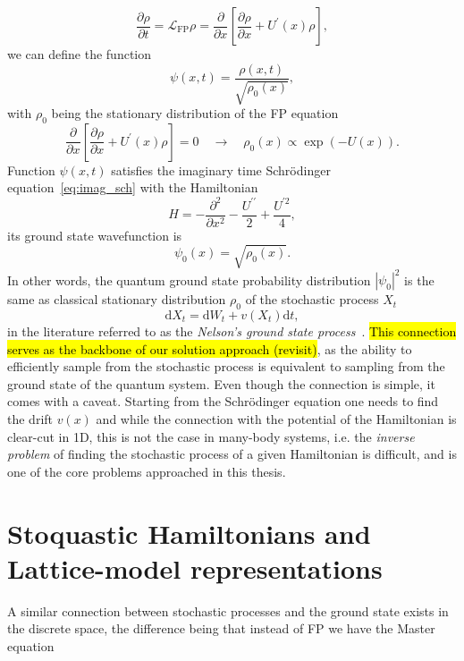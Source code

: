 \begin{equation}
	\frac{\partial \rho}{\partial t}=\mathcal{L}_{\mathrm{FP}} \rho=\frac{\partial}{\partial x}\left[\frac{\partial \rho}{\partial x}+U^{\prime}(x) \rho\right],
\end{equation}
we can define the function 
\begin{equation}
	\psi(x, t)=\frac{\rho(x, t)}{\sqrt{\rho_{0}(x)}},
\end{equation}
with $\rho_{0}$ being the stationary distribution of the FP equation
\begin{equation}
	\frac{\partial}{\partial x}\left[\frac{\partial \rho}{\partial x}+U^{\prime}(x) \rho\right] = 0 \quad \rightarrow \quad \rho_{0}(x) \propto \exp (-U(x)).
\end{equation}
Function $\psi(x, t)$ satisfies the imaginary time Schr\" odinger equation~\eqref{eq:imag_sch} with the Hamiltonian
\begin{equation}
	H=-\frac{\partial^{2}}{\partial x^{2}}-\frac{U^{\prime \prime}}{2}+\frac{U^{\prime 2}}{4}, 
\end{equation}
its ground state wavefunction is 
\begin{equation}
	\psi_{0}(x)=\sqrt{\rho_{0}(x)}.
\end{equation}
In other words, the quantum ground state probability distribution $|\psi_{0}|^2$ is the same as classical stationary distribution $\rho_{0}$ of the stochastic process $X_{t}$
\begin{equation}
	\mathrm{d} X_{t}=\mathrm{d} W_{t}+v\left(X_{t}\right) \mathrm{d} t,
\end{equation}
in the literature referred to as the \emph{Nelson's ground state process}~\cite{nelson1967dynamical, albeverio1977energy}. \hl{This connection serves as the backbone of our solution approach (revisit)}, as the ability to efficiently sample from the stochastic process is equivalent to sampling from the ground state of the quantum system. Even though the connection is simple, it comes with a caveat. Starting from the Schr\" odinger equation one needs to find the drift $v(x)$ and while the connection with the potential of the Hamiltonian is clear-cut in 1D, this is not the case in many-body systems, i.e. the \emph{inverse problem} of finding the stochastic process of a given Hamiltonian is difficult, and is one of the core problems approached in this thesis.

\newpage
\section{Stoquastic Hamiltonians and Lattice-model representations}
\label{subsec:fk-latt}
A similar connection between stochastic processes and the ground state exists in the discrete space, the difference being that instead of FP we have the Master equation


